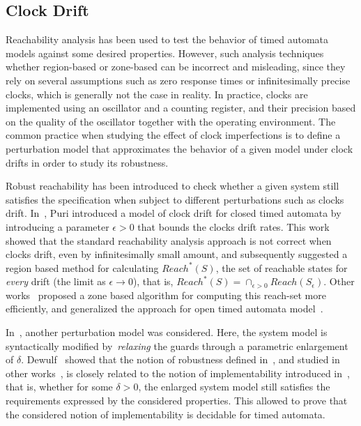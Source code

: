 \subsection{Clock Drift}

Reachability analysis has been used to test the behavior
of timed automata models against some desired properties. However, such analysis
techniques whether region-based or zone-based can be incorrect and misleading,
since they rely on several assumptions such as zero response times or infinitesimally  
precise clocks, which is generally not the case in reality. In practice, clocks are 
implemented using an oscillator and a counting register, and their precision based on 
the quality of the oscillator together with the operating environment.
The common practice when studying the effect of clock imperfections is to define a perturbation
model that approximates the behavior of a given model under clock drifts in order to study its 
robustness. 

Robust reachability has been introduced to check whether a given
system still satisfies the specification when
subject to different perturbations such as clocks drift.
In~\cite{drift:puri}, Puri introduced a model of clock drift for closed timed automata
by introducing a parameter $\epsilon>0$ that bounds the clocks drift rates.
This work showed that the standard reachability analysis approach is not correct
when clocks drift, even by infinitesimally small amount, and subsequently suggested a region 
based method for calculating $Reach^*(S)$, the set of reachable states for \emph{every} drift 
(the limit as $\epsilon\to 0$),
that is, $Reach^*(S)=\cap_{\epsilon>0} Reach(S_{\epsilon})$. Other 
works~\cite{drift:conrad,drift:puriR} proposed a zone based algorithm for computing this 
reach-set more efficiently, and generalized the approach for open timed automata 
model~\cite{drift:puriR}.

In~\cite{drift:wulf,drift:puri}, another perturbation model was considered. Here, 
the system model is syntactically modified by~\emph{relaxing} the guards through 
a parametric enlargement of $\delta$.
Dewulf~\cite{drift:wulf} showed that the notion of robustness defined in~\cite{drift:puri}, and
studied in other works~\cite{drift:conrad, drift:puriR}, is closely related to the notion of 
implementability introduced in~\cite{drift:wulf}, that is, whether for some $\delta>0$,
the enlarged system model still satisfies the requirements expressed by the considered 
properties.
This allowed to prove that the considered notion of implementability is decidable 
for timed automata.

